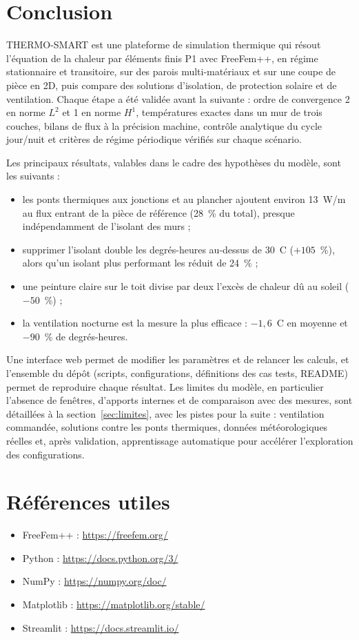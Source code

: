 \section{Conclusion}\label{sec:conclusion}
THERMO-SMART est une plateforme de simulation thermique qui résout l'équation de la chaleur par éléments finis P1
avec FreeFem++, en régime stationnaire et transitoire, sur des parois multi-matériaux et sur une coupe de pièce en
2D, puis compare des solutions d'isolation, de protection solaire et de ventilation. Chaque étape a été validée avant
la suivante : ordre de convergence 2 en norme $L^2$ et 1 en norme $H^1$, températures exactes dans un mur de trois
couches, bilans de flux à la précision machine, contrôle analytique du cycle jour/nuit et critères de régime
périodique vérifiés sur chaque scénario.

Les principaux résultats, valables dans le cadre des hypothèses du modèle, sont les suivants :
\begin{itemize}
	\item les ponts thermiques aux jonctions et au plancher ajoutent environ 13~W/m au flux entrant de la pièce
	de référence (28~\% du total), presque indépendamment de l'isolant des murs ;
	\item supprimer l'isolant double les degrés-heures au-dessus de 30~\textdegree C ($+105$~\%), alors qu'un isolant
	plus performant les réduit de 24~\% ;
	\item une peinture claire sur le toit divise par deux l'excès de chaleur dû au soleil ($-50$~\%) ;
	\item la ventilation nocturne est la mesure la plus efficace : $-1{,}6$~\textdegree C en moyenne et $-90$~\% de
	degrés-heures.
\end{itemize}

Une interface web permet de modifier les paramètres et de relancer les calculs, et l'ensemble du dépôt (scripts,
configurations, définitions des cas tests, README) permet de reproduire chaque résultat. Les limites du modèle, en
particulier l'absence de fenêtres, d'apports internes et de comparaison avec des mesures, sont détaillées à la
section~\ref{sec:limites}, avec les pistes pour la suite : ventilation commandée, solutions contre les ponts
thermiques, données météorologiques réelles et, après validation, apprentissage automatique pour accélérer
l'exploration des configurations.

\section*{Références utiles}
\begin{itemize}
	\item FreeFem++ : \url{https://freefem.org/}
	\item Python : \url{https://docs.python.org/3/}
	\item NumPy : \url{https://numpy.org/doc/}
	\item Matplotlib : \url{https://matplotlib.org/stable/}
	\item Streamlit : \url{https://docs.streamlit.io/}
\end{itemize}